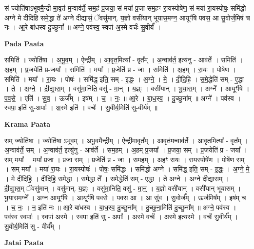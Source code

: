 \documentclass[17pt]{extarticle}
\begin{document}
सं ज्योति॑षाऽभूवमै॒न्द्री-मा॒वृत॑-म॒न्वाव॑र्ते॒ सम॒हं प्र॒जया॒ सं मया᳚ प्र॒जा सम॒हꣳ रा॒यस्पोषे॑ण॒ सं मया॑ रा॒यस्पोषः॒ समि॑द्धो अग्ने मे दीदिहि समे॒द्धा ते॑ अग्ने दीद्यासं॒ ॅवसु॑मान्. य॒ज्ञो वसी॑यान् भूयास॒मग्न॒ आयूꣳ॑षि पवस॒ आ सु॒वोर्ज॒मिषं॑ च नः । आ॒रे बा॑धस्व दु॒च्छुनां᳚ ॥ अग्ने॒ पव॑स्व॒ स्वपा॑ अ॒स्मे वर्चः॑ सु॒वीर्यं᳚ । \newline

\textbf{Pada Paata} \newline

समिति॑ । ज्योति॑षा । अ॒भू॒व॒म् । ऐ॒न्द्रीम् । आ॒वृत॒मित्या᳚ - वृत᳚म् । अ॒न्वाव॑र्त॒ इत्य॑नु - आव॑र्ते । समिति॑ । अ॒हम् । प्र॒जयेति॑ प्र-जया᳚ । समिति॑ । मया᳚ । प्र॒जेति॑ प्र - जा । समिति॑ । अ॒हम् । रा॒यः । पोषे॑ण । समिति॑ । मया᳚ । रा॒यः । पोषः॑ । समि॑द्ध॒ इति॒ सम् - इ॒द्धः॒ । अ॒ग्ने॒ । मे॒ । दी॒दि॒हि॒ । स॒मे॒द्धेति॑ सम् - ए॒द्धा । ते॒ । अ॒ग्ने॒ । दी॒द्या॒स॒म् । वसु॑मा॒निति॒ वसु॑ - मा॒न् । य॒ज्ञ्ः । वसी॑यान् । भू॒या॒स॒म् । अग्ने᳚ । आयूꣳ॑षि । प॒व॒से॒ । एति॑ । सु॒व॒ । ऊर्ज᳚म् । इष᳚म् । च॒ । नः॒ ॥ आ॒रे । बा॒ध॒स्व॒ । दु॒च्छुना᳚म् ॥ अग्ने᳚ । पव॑स्व । स्वपा॒ इति॑ सु-अपाः᳚ । अ॒स्मे इति॑ । वर्चः॑ । सु॒वीर्य॒मिति॑ सु-वीर्य᳚म् ॥  \newline


\textbf{Krama Paata} \newline

सम् ज्योति॑षा । ज्योति॑षा ऽभूवम् । अ॒भू॒व॒मै॒न्द्रीम् । ऐ॒न्द्रीमा॒वृत᳚म् । आ॒वृत॑म॒न्वाव॑र्ते । आ॒वृत॒मित्या᳚ - वृत᳚म् । अ॒न्वाव॑र्ते॒ सम् । अ॒न्वाव॑र्त॒ इत्यु॑नु - आव॑र्ते । सम॒हम् । अ॒हम् प्र॒जया᳚ । प्र॒जया॒ सम् । प्र॒जयेति॑ प्र - जया᳚ । सम् मया᳚ । मया᳚ प्र॒जा । प्र॒जा सम् । प्र॒जेति॑ प्र - जा । सम॒हम् । अ॒हꣳ रा॒यः । रा॒यस्पोषे॑ण । पोषे॑ण॒ सम् । सम् मया᳚ । मया॑ रा॒यः । रा॒यस्पोषः॑ । पोषः॒ समि॑द्धः । समि॑द्धो अग्ने । समि॑द्ध॒ इति॒ सम् - इ॒द्धः॒ । अ॒ग्ने॒ मे॒ । मे॒ दी॒दि॒हि॒ । दी॒दि॒हि॒ स॒मे॒द्धा । स॒मे॒द्धा ते᳚ । स॒मे॒द्धेति॑ सम् - ए॒द्धा । ते॒ अ॒ग्ने॒ । अ॒ग्ने॒ दी॒द्या॒स॒म् । दी॒द्या॒स॒म् ॅवसु॑मान् । वसु॑मान्. य॒ज्ञ्ः । वसु॑मा॒निति॒ वसु॑ - मा॒न्॒ । य॒ज्ञो वसी॑यान् । वसी॑यान् भूयासम् । भू॒या॒स॒मग्ने᳚ । अग्न॒ आयूꣳ॑षि । आयूꣳ॑षि पवसे । प॒व॒स॒ आ । आ सु॑व । सु॒वोर्ज᳚म् । ऊर्ज॒मिष᳚म् । इष॑म् च । च॒ नः॒ । न॒ इति॑ नः ॥ आ॒रे बा॑धस्व । बा॒ध॒स्व॒ दु॒च्छुना᳚म् । दु॒च्छुना॒मिति॑ दु॒च्छुना᳚म् ॥ अग्ने॒ पव॑स्व । पव॑स्व॒ स्वपाः᳚ । स्वपा॑ अ॒स्मे । स्वपा॒ इति॑ सु - अपाः᳚ । अ॒स्मे वर्चः॑ । अ॒स्मे इत्य॒स्मे । वर्चः॑ सु॒वीर्य᳚म् । सु॒वीर्य॒मिति॑ सु - वीर्य᳚म् । \newline

\textbf{Jatai Paata} \newline
\end{document}
